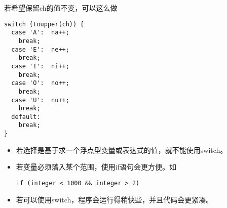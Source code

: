 \begin{frame}[fragile]\ft{\secname}
若希望保留ch的值不变，可以这么做
\begin{lstlisting}
switch (toupper(ch)) {
  case 'A':  na++;
    break;
  case 'E':  ne++;
    break;
  case 'I':  ni++;
    break;
  case 'O':  no++;
    break;
  case 'U':  nu++;
    break;
  default:
    break;
}
\end{lstlisting}  
\end{frame}

\begin{frame}[fragile]
\begin{itemize}
\item
若选择是基于求一个浮点型变量或表达式的值，就不能使用switch。\\[0.1in]
\item
若变量必须落入某个范围，使用if语句会更方便。如
\begin{lstlisting}
if (integer < 1000 && integer > 2)  
\end{lstlisting}
\vspace{0.1in}
\item 若可以使用switch，程序会运行得稍快些，并且代码会更紧凑。 
\end{itemize}         
\end{frame}




